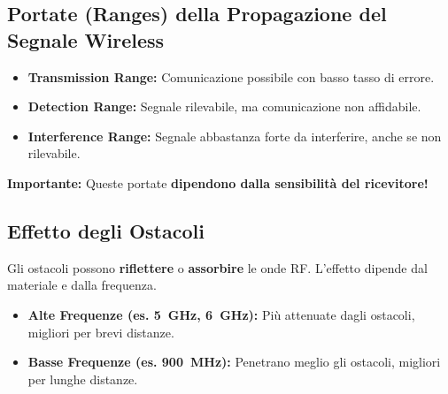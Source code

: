 \documentclass{article}
\begin{document}
\subsection{Portate (Ranges) della Propagazione del Segnale Wireless}
\begin{itemize}
    \item \textbf{Transmission Range:} Comunicazione possibile con basso tasso di errore.
    \item \textbf{Detection Range:} Segnale rilevabile, ma comunicazione non affidabile.
    \item \textbf{Interference Range:} Segnale abbastanza forte da interferire, anche se non rilevabile.
\end{itemize}
\textbf{Importante:} Queste portate \textbf{dipendono dalla sensibilità del ricevitore!}
\begin{center}
\end{center}

\subsection{Effetto degli Ostacoli}
Gli ostacoli possono \textbf{riflettere} o \textbf{assorbire} le onde RF. L'effetto dipende dal materiale e dalla frequenza.
\begin{itemize}
    \item \textbf{Alte Frequenze (es. \SI{5}{\giga\hertz}, \SI{6}{\giga\hertz}):} Più attenuate dagli ostacoli, migliori per brevi distanze.
    \item \textbf{Basse Frequenze (es. \SI{900}{\mega\hertz}):} Penetrano meglio gli ostacoli, migliori per lunghe distanze.
\end{itemize}
\end{document}
